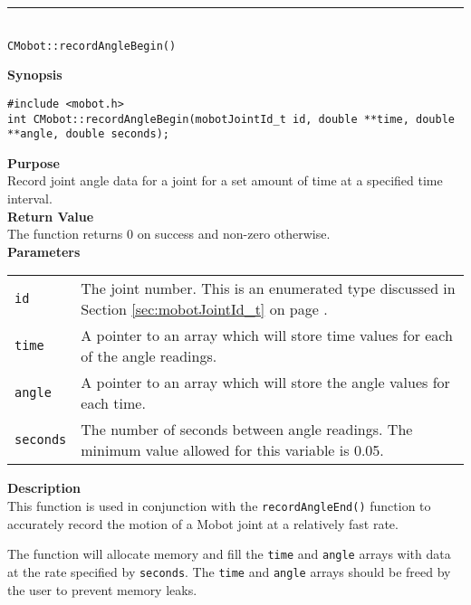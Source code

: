 \noindent
\vspace{5pt}
\rule{4.5in}{0.015in}\\
\noindent
{\LARGE \texttt{CMobot::recordAngleBegin()}}\\
{}

\noindent
{\bf Synopsis}
\vspace{-8pt}
\begin{verbatim}
#include <mobot.h>
int CMobot::recordAngleBegin(mobotJointId_t id, double **time, double **angle, double seconds);
\end{verbatim}

\noindent
{\bf Purpose}\\
Record joint angle data for a joint for a set amount of time at a specified time interval.\\

\noindent
{\bf Return Value}\\
The function returns 0 on success and non-zero otherwise.\\

\noindent
{\bf Parameters}\\
\vspace{-0.1in}
\begin{description}
\item               
\begin{tabular}{p{15 mm}p{145 mm}}
\texttt{id} & The joint number. This is an enumerated type 
discussed in Section \ref{sec:mobotJointId_t} on page
\pageref{sec:mobotJointId_t}.\\
\texttt{time} & A pointer to an array which will store time values for each of the angle readings. \\
\texttt{angle} & A pointer to an array which will store the angle values for each time. \\
\texttt{seconds} & The number of seconds between angle readings. The minimum value allowed for
this variable is 0.05.
\end{tabular}
\end{description}

\noindent
{\bf Description}\\
This function is used in conjunction with the \texttt{recordAngleEnd()}
function to accurately record the motion of a Mobot joint at a relatively fast
rate. 

The function will allocate memory and fill the \texttt{time} and \texttt{angle} arrays with data
at the rate specified by \texttt{seconds}. The \texttt{time} and \texttt{angle} arrays should
be freed by the user to prevent memory leaks.

